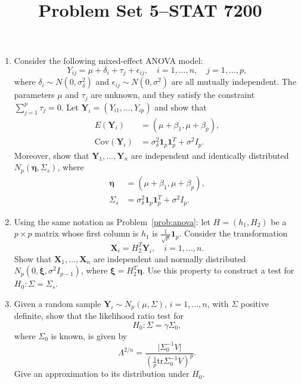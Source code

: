 \documentclass[12pt]{paper}
\title{	
Problem Set 5--STAT 7200
}
\author{} %
\date{} %
\numberwithin{equation}{section} %
\numberwithin{figure}{section} %
\numberwithin{table}{section} %
\begin{document}
\maketitle %


\begin{enumerate}
	\item\label{prob:anova} Consider the following mixed-effect ANOVA model:
	$$ Y_{ij} = \mu + \delta_i + \tau_j + \epsilon_{ij}, \quad i=1, \ldots, n, \quad j = 1, \ldots, p,$$
	where $\delta_i \sim N(0, \sigma^2_\delta)$ and $\epsilon_{ij} \sim N(0, \sigma^2)$ are all mutually independent. The parameters $\mu$ and $\tau_j$ are unknown, and they satisfy the constraint $\sum_{j=1}^p \tau_j = 0$. Let $\mathbf{Y}_i = (Y_{i1}, \ldots, Y_{ip})$ and show that
	\begin{align*}
	E(\mathbf{Y}_i) &= (\mu + \beta_1, \mu + \beta_p),\\
	\mathrm{Cov}(\mathbf{Y}_i) &= \sigma^2_\delta \mathbf{1}_p\mathbf{1}_p^T + \sigma^2 I_p.
	\end{align*}
	Moreover, show that $\mathbf{Y}_1, \ldots, \mathbf{Y}_n$ are independent and identically distributed $N_p(\boldsymbol{\eta}, \Sigma_s)$, where
	\begin{align*}
	\boldsymbol{\eta} &= (\mu + \beta_1, \mu + \beta_p),\\
	\Sigma_s &= \sigma^2_\delta \mathbf{1}_p\mathbf{1}_p^T + \sigma^2 I_p.
	\end{align*} 
	
	\vspace{1.5cm}\item Using the same notation as Problem~\ref{prob:anova}: let $H = (h_1, H_2)$ be a $p\times p$ matrix whose first column is $h_1$ is $\frac{1}{\sqrt{p}}\mathbf{1}_p$. Consider the transformation
	$$ \mathbf{X}_i = H^T_2 \mathbf{Y}_i, \quad i=1,\ldots, n.$$
	Show that $\mathbf{X}_1, \ldots,\mathbf{X}_n$ are independent and normally distributed $N_p(0, \boldsymbol{\xi}, \sigma^2I_{p-1})$, where $\boldsymbol{\xi} = H^T_2\boldsymbol{\eta}$. Use this property to construct a test for $H_0: \Sigma = \Sigma_s$.
	
	\vspace{1.5cm}\item Given a random sample $\mathbf{Y}_i\sim N_p(\mu, \Sigma)$, $i=1,\ldots, n$, with $\Sigma$ positive definite, show that the likelihood ratio test for
	$$ H_0 : \Sigma = \gamma \Sigma_0,$$
	where $\Sigma_0$ is known, is given by
	$$\Lambda^{2/n} = \frac{\lvert \Sigma_0^{-1}V \rvert}{\left(\frac{1}{p} \mathrm{tr} \Sigma_0^{-1}V \right)^p}.$$
	Give an approximation to its distribution under $H_0$.
	

\end{enumerate}
\end{document}

